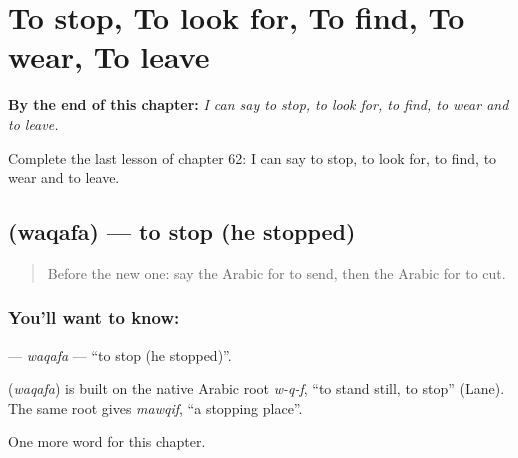 
\chapter{To stop, To look for, To find, To wear, To leave}
\label{ch:ar-to-stop-to-look-for-to-find-to-wear-to-leave}

\begin{chapteropening}
\textbf{By the end of this chapter:} \emph{I can say to stop, to look for, to find, to wear and to leave.}

Complete the last lesson of chapter 62: I can say to stop, to look for, to find, to wear and to leave.
\end{chapteropening}

\section[\texorpdfstring{\ar{وقف} (waqafa)}{وقف (waqafa)}]{ (waqafa) — to stop (he stopped)}

\label{lesson:AR-C62-waqafa}



\begin{quote}
Before the new one: say the Arabic for to send, then the Arabic for to cut.
\end{quote}

\subsection*{You'll want to know: }
\textbf{} — \emph{waqafa} — \textquotedblleft{}to stop (he stopped)\textquotedblright{}.

\begin{cousinweb}
\textbf{} (\emph{waqafa}) is built on the native Arabic root \emph{w-q-f}, \textquotedblleft{}to stand still, to stop\textquotedblright{} (Lane). The same root gives \emph{mawqif}, \textquotedblleft{}a stopping place\textquotedblright{}.
\end{cousinweb}

\begin{grammarlens}[title={What you've built}]
One more word for this chapter.
\end{grammarlens}

